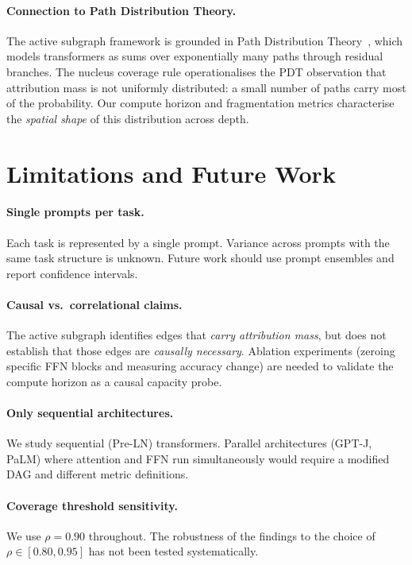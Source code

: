 \documentclass{article}
\begin{document}
\paragraph{Connection to Path Distribution Theory.}
The active subgraph framework is grounded in Path Distribution
Theory~\citep{elhage2021mathematical}, which models transformers as
sums over exponentially many paths through residual branches.
The nucleus coverage rule operationalises the PDT observation that
attribution mass is not uniformly distributed: a small number of paths
carry most of the probability.
Our compute horizon and fragmentation metrics characterise the
\emph{spatial shape} of this distribution across depth.

\section{Limitations and Future Work}
\label{sec:limitations}

\paragraph{Single prompts per task.}
Each task is represented by a single prompt.
Variance across prompts with the same task structure is unknown.
Future work should use prompt ensembles and report confidence intervals.

\paragraph{Causal vs.\ correlational claims.}
The active subgraph identifies edges that \emph{carry attribution
mass}, but does not establish that those edges are \emph{causally
necessary}.
Ablation experiments (zeroing specific FFN blocks and measuring accuracy
change) are needed to validate the compute horizon as a causal
capacity probe.

\paragraph{Only sequential architectures.}
We study sequential (Pre-LN) transformers.
Parallel architectures (GPT-J, PaLM) where attention and FFN run
simultaneously would require a modified DAG and different metric
definitions.

\paragraph{Coverage threshold sensitivity.}
We use $\rho = 0.90$ throughout.
The robustness of the findings to the choice of $\rho \in [0.80, 0.95]$
has not been tested systematically.
\end{document}
